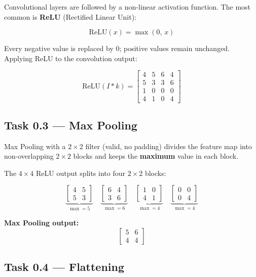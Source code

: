 \documentclass[12pt,a4paper]{article}
\begin{document}
Convolutional layers are followed by a non-linear activation function.
The most common is \textbf{ReLU} (Rectified Linear Unit):

\[
\text{ReLU}(x) = \max(0,\, x)
\]

Every negative value is replaced by 0; positive values remain unchanged.
Applying ReLU to the convolution output:

\[
\text{ReLU}(I * k) =
\begin{bmatrix}
4 & 5 & 6 & 4\\
5 & 3 & 3 & 6\\
1 & 0 & 0 & 0\\
4 & 1 & 0 & 4
\end{bmatrix}
\]

\subsection{Task 0.3 — Max Pooling}

Max Pooling with a $2\times2$ filter (valid, no padding) divides the feature map
into non-overlapping $2\times2$ blocks and keeps the \textbf{maximum} value in each block.

\medskip
The $4\times4$ ReLU output splits into four $2\times2$ blocks:

\[
\underbrace{\begin{bmatrix}4&5\\5&3\end{bmatrix}}_{\max=5}
\quad
\underbrace{\begin{bmatrix}6&4\\3&6\end{bmatrix}}_{\max=6}
\quad
\underbrace{\begin{bmatrix}1&0\\4&1\end{bmatrix}}_{\max=4}
\quad
\underbrace{\begin{bmatrix}0&0\\0&4\end{bmatrix}}_{\max=4}
\]

\textbf{Max Pooling output:}
\[
\begin{bmatrix}5 & 6\\4 & 4\end{bmatrix}
\]

\subsection{Task 0.4 — Flattening}
\end{document}
